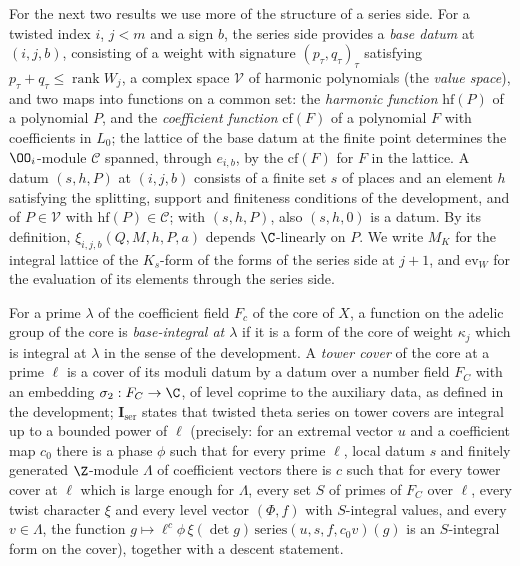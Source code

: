 For the next two results we use more of the structure of a series side. For a twisted index $i$, $j<m$ and a
sign $b$, the series side provides a \emph{base datum} at $(i,j,b)$, consisting of a weight with signature
$(p_\tau,q_\tau)_\tau$ satisfying $p_\tau+q_\tau\le\operatorname{rank}W_j$, a complex space $\mathcal V$ of harmonic
polynomials (the \emph{value space}), and two maps into functions on a common set: the \emph{harmonic
function} $\mathrm{hf}(P)$ of a polynomial $P$, and the \emph{coefficient function} $\mathrm{cf}(F)$ of a polynomial $F$
with coefficients in $L_0$; the lattice of the base datum at the finite point determines the $\OO_i$-module
$\mathcal C$ spanned, through $e_{i,b}$, by the $\mathrm{cf}(F)$ for $F$ in the lattice. A datum $(s,h,P)$ at $(i,j,b)$
consists of a finite set $s$ of places and an element $h$ satisfying the splitting, support and finiteness
conditions of the development, and of $P\in\mathcal V$ with $\mathrm{hf}(P)\in\mathcal C$; with $(s,h,P)$, also $(s,h,0)$ is a
datum. By its definition, $\xi_{i,j,b}(Q,M,h,P,a)$ depends $\C$-linearly on $P$. We write $M_K$ for the integral
lattice of the $K_s$-form of the forms of the series side at $j+1$, and $\mathrm{ev}_W$ for the evaluation of its
elements through the series side.

For a prime $\lambda$ of the coefficient field $F_c$ of the core of $X$, a function on the adelic group of the
core is \emph{base-integral at $\lambda$} if it is a form of the core of weight $\kappa_j$ which is integral at
$\lambda$ in the sense of the development. A \emph{tower cover} of the core at a prime $\ell$ is a cover of its moduli
datum by a datum over a number field $F_C$ with an embedding $\sigma_2:F_C\to\C$, of level coprime to the
auxiliary data, as defined in the development; $\mathbf I_{\mathrm{ser}}$ states that twisted theta series on tower
covers are integral up to a bounded power of $\ell$ (precisely: for an extremal vector $u$ and a coefficient map
$c_0$ there is a phase $\phi$ such that for every prime $\ell$, local datum $s$ and finitely generated $\Z$-module
$\Lambda$ of coefficient vectors there is $c$ such that for every tower cover at $\ell$ which is large enough for
$\Lambda$, every set $S$ of primes of $F_C$ over $\ell$, every twist character $\xi$ and every level vector $(\Phi,f)$ with
$S$-integral values, and every $v\in\Lambda$, the function $g\mapsto\ell^c\phi\,\xi(\det g)\,\mathrm{series}(u,s,f,c_0v)(g)$ is an
$S$-integral form on the cover), together with a descent statement.

